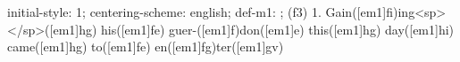 initial-style: 1;
centering-scheme: english;
def-m1: \grealign;
(f3) 1. Gain([em1]fi)ing<sp> </sp>([em1]hg) his([em1]fe) guer-([em1]f)don([em1]e) this([em1]hg) day([em1]hi) came([em1]hg) to([em1]fe) en([em1]fg)ter([em1]gv)